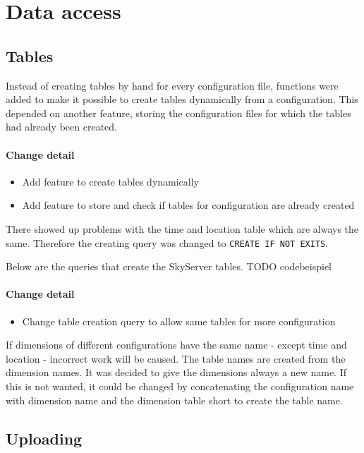 \section{Data access}

\subsection{Tables}

Instead of creating tables by hand for every configuration file, functions
were added to make it possible to create tables dynamically from
a configuration. This depended on another feature,
storing the configuration files for which the tables had already been created.

\paragraph{Change detail}
\begin{itemize}
  \item Add feature to create tables dynamically
  \item Add feature to store and check if tables for configuration are already created
\end{itemize}

There showed up problems with the time and location table
which are always the same. Therefore the creating query
was changed to \texttt{CREATE IF NOT EXITS}.

Below are the queries that create the SkyServer tables.
TODO codebeispiel

\paragraph{Change detail}
\begin{itemize}
  \item Change table creation query to allow same tables for more configuration
\end{itemize}

If dimensions of different configurations have the same name - except time and location - 
incorrect work will be caused. The table names are created from the dimension names.
It was decided to give the dimensions always a new name. If this is
not wanted, it could be changed by concatenating
the configuration name with dimension name and the dimension table short
to create the table name.

\subsection{Uploading}
